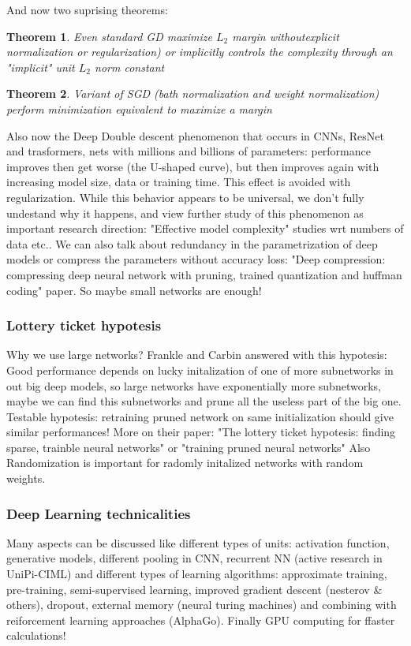 \documentclass[12pt]{book}
\newtheorem{theorem}{Theorem}
\begin{document}
And now two suprising theorems:
\begin{theorem}
	Even standard GD maximize $L_2$ margin withoutexplicit normalization or regularization) or implicitly controls the complexity through an "implicit" unit $L_2$ norm constant 
\end{theorem}

\begin{theorem}
	Variant of SGD (bath normalization and weight normalization) perform minimization equivalent to maximize a margin
\end{theorem}

Also now the Deep Double descent phenomenon that occurs in CNNs, ResNet and trasformers, nets with millions and billions of parameters: performance improves then get worse (the U-shaped curve), but then improves again with increasing model size, data or training time. This effect is avoided with regularization. While this behavior appears to be universal, we don't fully undestand why it happens, and view further study of this phenomenon as important research direction: "Effective model complexity" studies wrt numbers of data etc..
\newline\newline
We can also talk about redundancy in the parametrization of deep models or compress the parameters without accuracy loss: "Deep compression: compressing deep neural network with pruning, trained quantization and huffman coding" paper. So maybe small networks are enough!\newline
\subsubsection{Lottery ticket hypotesis}
Why we use large networks?\newline
Frankle and Carbin answered with this hypotesis: Good performance depends on lucky initalization of one of more subnetworks in out big deep models, so large networks have exponentially more subnetworks, maybe we can find this subnetworks and prune all the useless part of the big one.\newline
Testable hypotesis: retraining pruned network on same initialization should give similar performances! More on their paper: "The lottery ticket hypotesis: finding sparse, trainble neural networks" or "training pruned neural networks" \newline
Also Randomization is important for radomly initalized networks with random weights.

\subsubsection{Deep Learning technicalities}
Many aspects can be discussed like different types of units: activation function, generative models, different pooling in CNN, recurrent NN (active research in UniPi-CIML) and different types of learning algorithms: approximate training, pre-training, semi-supervised learning, improved gradient descent (nesterov \& others), dropout, external memory (neural turing machines) and combining with reiforcement learning approaches (AlphaGo). Finally GPU computing for ffaster calculations!
\end{document}
